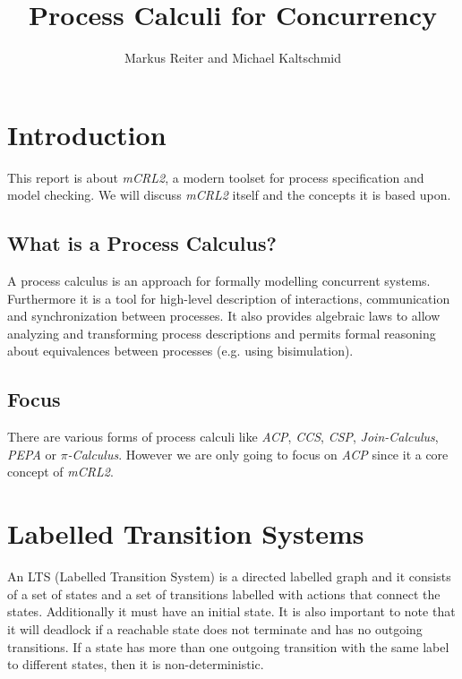 \documentclass{clseminar}
\title{Process Calculi for Concurrency}
\author{Markus Reiter and Michael Kaltschmid}
\begin{document}
  \maketitle
  \newpage
  \tableofcontents

  \section{Introduction}
  This report is about \textit{mCRL2}, a modern toolset for process specification and model checking. We will discuss \textit{mCRL2} itself and the concepts it is based upon.

  \subsection{What is a Process Calculus?}

  A process calculus is an approach for formally modelling concurrent systems. Furthermore it is a tool for high-level description of interactions, communication and synchronization between processes. It also provides algebraic laws to allow analyzing and transforming process descriptions and permits formal reasoning about equivalences between processes (e.g. using bisimulation). \cite{process_calculus_wiki}

  \subsection{Focus}

  There are various forms of process calculi like \textit{ACP}, \textit{CCS}, \textit{CSP}, \textit{Join-Calculus}, \textit{PEPA} or \textit{$\pi$-Calculus}. However we are only going to focus on \textit{ACP} since it a core concept of \textit{mCRL2}.

  \section{Labelled Transition Systems}

  An LTS (Labelled Transition System) is a directed labelled graph and it consists of a set of states and a set of transitions labelled with actions that connect the states. Additionally it must have an initial state. It is also important to note that it will deadlock if a reachable state does not terminate and has no outgoing
  transitions. If a state has more than one outgoing transition with the same label to different states, then it is non-deterministic.
\end{document}
